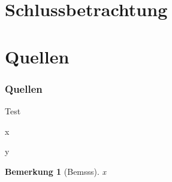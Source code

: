 \documentclass{beamer}
\newtheorem*{bem}{Bemerkung}
\begin{document}
\section{Schlussbetrachtung}
\begin{frame}

\end{frame}

\section*{Quellen}
\begin{frame}
\frametitle{Quellen}
\def\bibfont{\scriptsize}
\printbibliography
\end{frame}

\begin{frame}{Test}

x
\begin{definition}[Definition]
y
\end{definition}

\begin{bem}[Bemsss]
x
\end{bem}
\end{frame}
\end{document}
